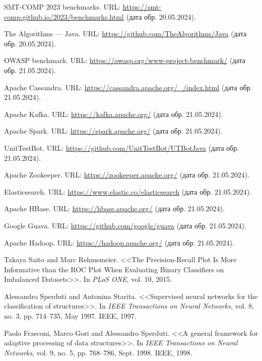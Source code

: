 \begin{thebibliography}{1}
 SMT-COMP 2023 benchmarks. URL: \url{https://smt-comp.github.io/2023/benchmarks.html} (дата обр. 20.05.2024).

 The Algorithms --- Java. URL: \url{https://github.com/TheAlgorithms/Java} (дата обр. 20.05.2024).

 OWASP benchmark. URL: \url{https://owasp.org/www-project-benchmark/} (дата обр. 21.05.2024).

 Apache Cassandra. URL: \url{https://cassandra.apache.org/_/index.html} (дата обр. 21.05.2024).

 Apache Kafka. URL: \url{https://kafka.apache.org/} (дата обр. 21.05.2024).

 Apache Spark. URL: \url{https://spark.apache.org/} (дата обр. 21.05.2024).

 UnitTestBot. URL: \url{https://github.com/UnitTestBot/UTBotJava} (дата обр. 21.05.2024).

 Apache Zookeeper. URL: \url{https://zookeeper.apache.org/} (дата обр. 21.05.2024).

 Elasticsearch. URL: \url{https://www.elastic.co/elasticsearch} (дата обр. 21.05.2024).

 Apache HBase. URL: \url{https://hbase.apache.org/} (дата обр. 21.05.2024).

 Google Guava. URL: \url{https://github.com/google/guava} (дата обр. 21.05.2024).

 Apache Hadoop. URL: \url{https://hadoop.apache.org/} (дата обр. 21.05.2024).

 Takaya Saito and Marc Rehmsmeier. <<The Precision-Recall Plot Is More Informative than the ROC Plot When Evaluating Binary Classifiers on Imbalanced Datasets>>. In \textit{PLoS ONE}, vol. 10, 2015.

 Alessandro Sperduti and Antonina Starita. <<Supervised neural networks for the classification of structures>>. In \textit{IEEE Transactions on Neural Networks}, vol. 8, no. 3, pp. 714--735, May 1997. IEEE, 1997.

 Paolo Frasconi, Marco Gori and Alessandro Sperduti. <<A general framework for adaptive processing of data structures>>. In \textit{IEEE Transactions on Neural Networks}, vol. 9, no. 5, pp. 768--786, Sept. 1998. IEEE, 1998.


\end{thebibliography}
